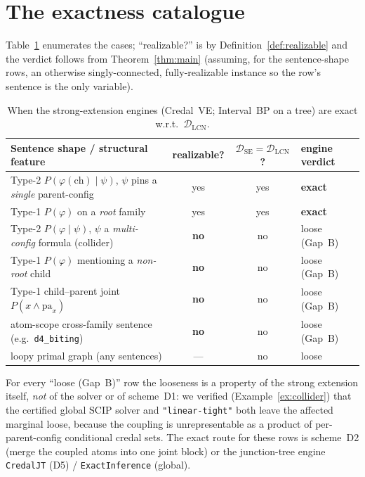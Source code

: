 \documentclass[11pt]{article}
\newcommand{\DSE}{\mathcal{D}_{\mathrm{SE}}}
\newcommand{\DLCN}{\mathcal{D}_{\mathrm{LCN}}}
\newcommand{\ch}{\mathrm{ch}}
\newcommand{\pa}{\mathrm{pa}}
\begin{document}
\section{The exactness catalogue}\label{sec:catalogue}

Table~\ref{tab:cat} enumerates the cases; ``realizable?'' is by Definition~\ref{def:realizable} and the
verdict follows from Theorem~\ref{thm:main} (assuming, for the sentence-shape rows, an otherwise
singly-connected, fully-realizable instance so the row's sentence is the only variable).

\begin{table}[ht]\centering\small
\caption{When the strong-extension engines (Credal~VE; Interval~BP on a tree) are exact w.r.t.\
$\DLCN$.}\label{tab:cat}
\begin{tabular}{@{}lccl@{}}
\toprule
Sentence shape / structural feature & realizable? & $\DSE{=}\DLCN$? & engine verdict \\
\midrule
Type-2 $P(\varphi(\ch)\mid\psi)$, $\psi$ pins a \emph{single} parent-config & yes & yes & \textbf{exact} \\
Type-1 $P(\varphi)$ on a \emph{root} family & yes & yes & \textbf{exact} \\
Type-2 $P(\varphi\mid\psi)$, $\psi$ a \emph{multi-config} formula (collider) & \textbf{no} & no & loose (Gap~B) \\
Type-1 $P(\varphi)$ mentioning a \emph{non-root} child & \textbf{no} & no & loose (Gap~B) \\
Type-1 child--parent joint $P(x\wedge\pa_x)$ & \textbf{no} & no & loose (Gap~B) \\
atom-scope cross-family sentence (e.g.\ \texttt{d4\_biting}) & \textbf{no} & no & loose (Gap~B) \\
loopy primal graph (any sentences) & --- & no & loose \\
\bottomrule
\end{tabular}
\end{table}

\noindent For every ``loose (Gap~B)'' row the looseness is a property of the strong extension itself,
\emph{not} of the solver or of scheme~D1: we verified (Example~\ref{ex:collider}) that the certified
global SCIP solver and \texttt{"linear-tight"} both leave the affected marginal loose, because the
coupling is unrepresentable as a product of per-parent-config conditional credal sets. The exact route
for these rows is scheme~D2 (merge the coupled atoms into one joint block) or the junction-tree engine
\texttt{CredalJT} (D5) / \texttt{ExactInference} (global).
\end{document}
